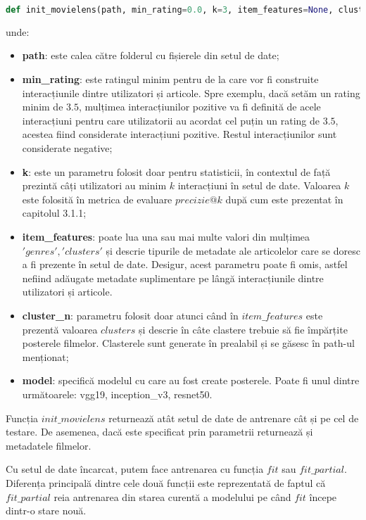 \begin{lstlisting}[language=Python, caption=Funcția de inițializare a bazei de date]
def init_movielens(path, min_rating=0.0, k=3, item_features=None, cluster_n=18, model='vgg19')
\end{lstlisting}
unde:
\begin{itemize}
	\item \textbf{path}: este calea către folderul cu fișierele din setul de date;
	\item \textbf{min\_rating}: este ratingul minim pentru de la care vor fi construite interacțiunile dintre utilizatori și articole. Spre exemplu, dacă setăm un rating minim de $3.5$, mulțimea interacțiunilor pozitive va fi definită de acele interacțiuni pentru care utilizatorii au acordat cel puțin un rating de $3.5$, acestea fiind considerate interacțiuni pozitive. Restul interacțiunilor sunt considerate negative;
	\item \textbf{k}: este un parametru folosit doar pentru statisticii, în contextul de față prezintă câți utilizatori au minim $k$ interacțiuni în setul de date. Valoarea $k$ este folosită în metrica de evaluare $precizie@k$ după cum este prezentat în capitolul 3.1.1; 
	\item \textbf{item\_features}: poate lua una sau mai multe valori din mulțimea ${'genres', 'clusters'}$ și descrie tipurile de metadate ale articolelor care se doresc a fi prezente în setul de date. Desigur, acest parametru poate fi omis, astfel nefiind adăugate metadate suplimentare pe lângă interacțiunile dintre utilizatori și articole.
	\item \textbf{cluster\_n}: parametru folosit doar atunci când în $item\_features$ este prezentă valoarea $clusters$ și descrie în câte clastere trebuie să fie împărțite posterele filmelor. Clasterele sunt generate în prealabil și se găsesc în path-ul menționat;
	\item \textbf{model}: specifică modelul cu care au fost create posterele. Poate fi unul dintre următoarele: vgg19, inception\_v3, resnet50.
\end{itemize}
Funcția $init\_movielens$ returnează atât setul de date de antrenare cât și pe cel de testare. De asemenea, dacă este specificat prin parametrii returnează și metadatele filmelor.

Cu setul de date încarcat, putem face antrenarea cu funcția $fit$ sau $fit\_partial$. Diferența principală dintre cele două funcții este reprezentată de faptul că $fit\_partial$ reia antrenarea din starea curentă a modelului pe când $fit$ începe dintr-o stare nouă. 

